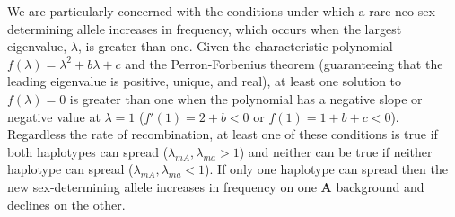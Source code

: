 \documentclass[12pt]{article}
\begin{document}

We are particularly concerned with the conditions under which a rare neo-sex-determining allele increases in frequency, which occurs when the largest eigenvalue, $\lambda$, is greater than one. 
Given the characteristic polynomial $f(\lambda)=\lambda^2+b\lambda+c$ and the Perron-Forbenius theorem (guaranteeing that the leading eigenvalue is positive, unique, and real), at least one solution to $f(\lambda)=0$ is greater than one when the polynomial has a negative slope or negative value at $\lambda=1$ ($f'(1) = 2 + b < 0$ or $f(1) = 1 + b + c < 0$).
Regardless the rate of recombination, at least one of these conditions is true if both haplotypes can spread ($\lambda_{mA}, \lambda_{ma} > 1$) and neither can be true if neither haplotype can spread ($\lambda_{mA}, \lambda_{ma} < 1$). 
If only one haplotype can spread then the new sex-determining allele increases in frequency on one \textbf{A} background and declines on the other.
\end{document}
